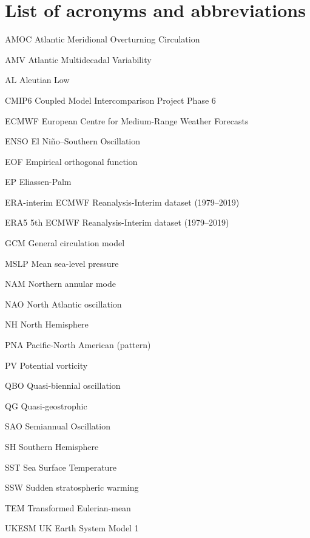 \chapter*{List of acronyms and abbreviations}

\begin{description*}

\item[AMOC] Atlantic Meridional Overturning Circulation
\item[AMV] Atlantic Multidecadal Variability
\item[AL] Aleutian Low
\item[CMIP6] Coupled Model Intercomparison Project Phase 6
\item[ECMWF] European Centre for Medium-Range Weather Forecasts
\item[ENSO] El Ni\~no--Southern Oscillation
\item[EOF] Empirical orthogonal function
\item[EP] Eliassen-Palm
\item[ERA-interim] ECMWF Reanalysis-Interim dataset (1979--2019)
\item[ERA5] 5th ECMWF Reanalysis-Interim dataset (1979--2019)
\item[GCM] General circulation model
\item[MSLP] Mean sea-level pressure
\item[NAM] Northern annular mode
\item[NAO] North Atlantic oscillation
\item[NH] North Hemisphere
\item[PNA] Pacific-North American (pattern)
\item[PV] Potential vorticity
\item[QBO] Quasi-biennial oscillation
\item[QG] Quasi-geostrophic
\item[SAO] Semiannual Oscillation
\item[SH] Southern Hemisphere
\item[SST] Sea Surface Temperature
\item[SSW] Sudden stratospheric warming
\item[TEM] Transformed Eulerian-mean
\item[UKESM] UK Earth System Model 1



\end{description*}



